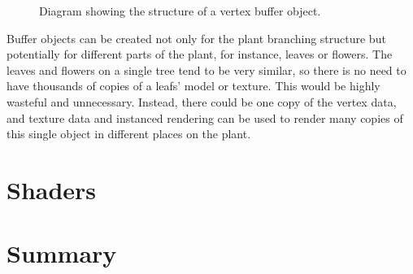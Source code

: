 \begin{figure}[htbp]
	{\centering
		\vspace{7px}
		\setlength{\fboxrule}{1pt}
		\caption{Diagram showing the structure of a vertex buffer object.}
	}
\end{figure}
\FloatBarrier

Buffer objects can be created not only for the plant branching structure but potentially for different parts of the plant, for instance, leaves or flowers. The leaves and flowers on a single tree tend to be very similar, so there is no need to have thousands of copies of a leafs' model or texture. This would be highly wasteful and unnecessary. Instead, there could be one copy of the vertex data, and texture data and instanced rendering can be used to render many copies of this single object in different places on the plant. 

\section{Shaders}

\section{Summary}








